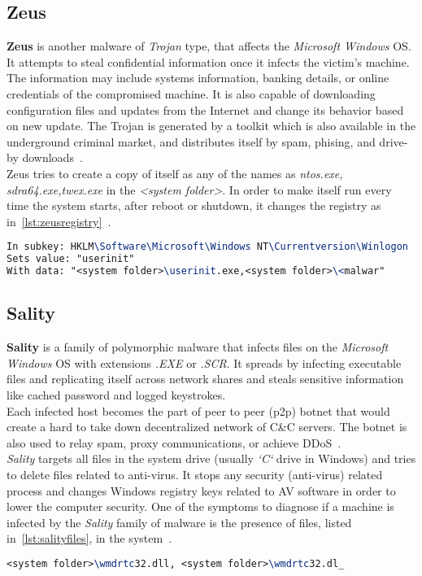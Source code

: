 \subsection{Zeus}
\label{sub:Zeus}
\textbf{Zeus} is another malware of \emph{Trojan} type, that affects the \emph{Microsoft Windows} OS\@.
It attempts to steal confidential information once it infects the victim's machine.
The information may include systems information, banking details, or online credentials of the compromised machine.
It is also capable of downloading configuration files and updates from the Internet and change its behavior based on new update.
The Trojan is generated by a toolkit which is also available in the underground criminal market, and distributes itself by spam, phising, and drive-by downloads~\cite[Trojan.Zbot]{zeus}.\\
Zeus tries to create a copy of itself as any of the names as \emph{ntos.exe, sdra64.exe,twex.exe} in the \textit{<system folder>}.
In order to make itself run every time the system starts, after reboot or shutdown, it changes the registry as in~\autoref{lst:zeusregistry}~\cite[Win32/Zbot]{zeusmicro}.
\begin{lstlisting}[numbers=none,language=TeX,caption={Registry key modified by Zeus Trojan to autostart},label={lst:zeusregistry}]
In subkey: HKLM\Software\Microsoft\Windows NT\Currentversion\Winlogon
Sets value: "userinit"
With data: "<system folder>\userinit.exe,<system folder>\<malwar"
\end{lstlisting}
\subsection{Sality}
\label{sub:Sality}
\textbf{Sality} is a family of polymorphic malware that infects files on the \emph{Microsoft Windows} OS with extensions \emph{.EXE} or \emph{.SCR}.
It spreads by infecting executable files and replicating itself across network shares and steals sensitive information like cached password and logged keystrokes.\\
Each infected host becomes the part of peer to peer (p2p) botnet that would create a hard to take down decentralized network of C\&C servers.
The botnet is also used to relay spam, proxy communications, or achieve DDoS~\cite[Sality]{salitysym}.\\
\emph{Sality} targets all files in the system drive (usually \emph{`C`} drive in Windows) and tries to delete files related to anti-virus.
It stops any security (anti-virus) related process  and changes Windows registry keys related to AV software in order to lower the computer security.
One of the symptoms to diagnose if a machine is infected by the \emph{Sality} family of malware is the presence of files, listed in~\autoref{lst:salityfiles}, in the system~\cite[Win32/Sality]{salitymicro}.
\begin{lstlisting}[numbers=none,language=TeX,caption={Files created by Sality in the infected machine},label={lst:salityfiles}]
<system folder>\wmdrtc32.dll, <system folder>\wmdrtc32.dl_
\end{lstlisting}
